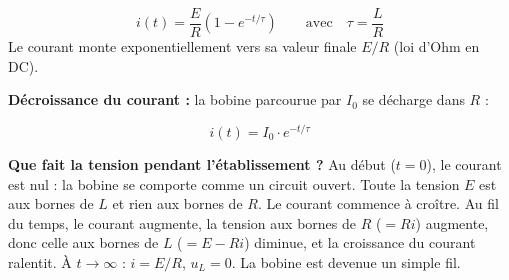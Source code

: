 \documentclass[12pt,a4paper,twoside]{book}
\begin{document}
\begin{formule}
\[
\boxed{i(t) = \frac{E}{R}\left(1 - e^{-t/\tau}\right)} \qquad \text{avec} \quad \boxed{\tau = \frac{L}{R}}
\]
Le courant monte exponentiellement vers sa valeur finale $E/R$ (loi d'Ohm en DC).
\end{formule}

\textbf{Décroissance du courant :} la bobine parcourue par $I_0$ se décharge dans $R$ :

\begin{formule}
\[
\boxed{i(t) = I_0 \cdot e^{-t/\tau}}
\]
\end{formule}

\begin{center}
\end{center}

\begin{intuition}
\textbf{Que fait la tension pendant l'établissement ?} Au début ($t = 0$), le courant est nul : la bobine se comporte comme un circuit ouvert. Toute la tension $E$ est aux bornes de $L$ et rien aux bornes de $R$. Le courant commence à croître. Au fil du temps, le courant augmente, la tension aux bornes de $R$ ($= Ri$) augmente, donc celle aux bornes de $L$ ($= E - Ri$) diminue, et la croissance du courant ralentit. À $t \to \infty$ : $i = E/R$, $u_L = 0$. La bobine est devenue un simple fil.
\end{intuition}
\end{document}
